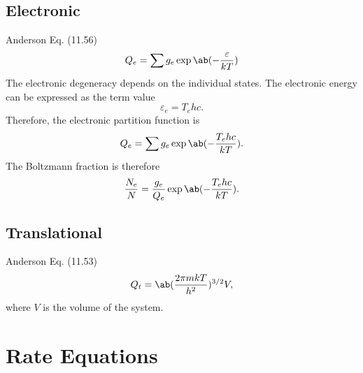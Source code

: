 \documentclass[11pt, twoside, fleqn]{report}
\begin{document}
    \subsection{Electronic}

    Anderson Eq. (11.56)
    \begin{equation*}
        Q_e = \sum g_e\exp\ab(-\frac{\varepsilon}{kT})
    \end{equation*}
    The electronic degeneracy depends on the individual states. The electronic energy can be expressed as the term value
    \begin{equation*}
        \varepsilon_e = T_ehc.
    \end{equation*}
    Therefore, the electronic partition function is
    \begin{equation*}
        Q_e = \sum g_e\exp\ab(-\frac{T_ehc}{kT}).
    \end{equation*}
    The Boltzmann fraction is therefore
    \begin{equation*}
        \frac{N_e}{N} = \frac{g_e}{Q_e}\exp\ab(-\frac{T_ehc}{kT}).
    \end{equation*}

    \subsection{Translational}

    Anderson Eq. (11.53)
    \begin{equation*}
        Q_t = \ab(\frac{2\pi mkT}{h^2})^{3/2}V,
    \end{equation*}
    where $V$ is the volume of the system.

    \section{Rate Equations}
\end{document}

